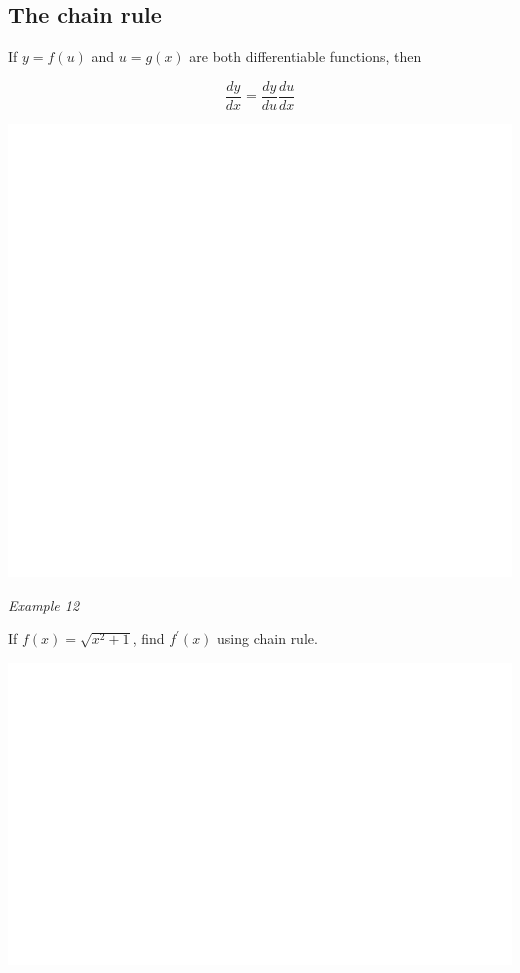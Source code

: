 \documentclass[]{book}
\begin{document}
\hypertarget{the-chain-rule}{%
\subsection{The chain rule}\label{the-chain-rule}}

If \(y=f(u)\) and \(u=g(x)\) are both differentiable functions, then

\[\frac{dy}{dx} = \frac{dy}{du}\frac{du}{dx} \]

\begin{center}\includegraphics[width=1\linewidth]{figure/LB21-1} \end{center}

\emph{Example 12}

If \(f(x)=\sqrt{x^2+1}\), find \(f^\prime(x)\) using chain rule.

\begin{center}\includegraphics[width=1\linewidth]{figure/LB22-1} \end{center}
\end{document}
